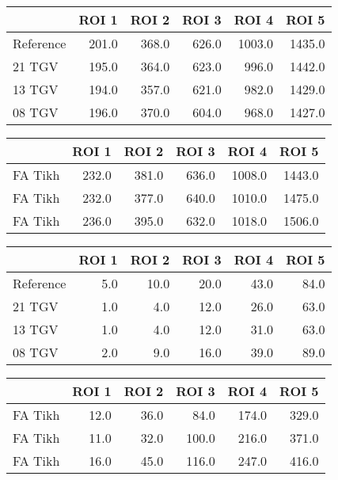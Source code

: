 \begin{tabular}{lrrrrr}
\toprule
{} &  ROI 1 &  ROI 2 &  ROI 3 &   ROI 4 &   ROI 5 \\
\midrule
Reference &  201.0 &  368.0 &  626.0 &  1003.0 &  1435.0 \\
21 TGV    &  195.0 &  364.0 &  623.0 &   996.0 &  1442.0 \\
13 TGV    &  194.0 &  357.0 &  621.0 &   982.0 &  1429.0 \\
08 TGV    &  196.0 &  370.0 &  604.0 &   968.0 &  1427.0 \\
\bottomrule
\end{tabular}
\begin{tabular}{lrrrrr}
\toprule
{} &  ROI 1 &  ROI 2 &  ROI 3 &   ROI 4 &   ROI 5 \\
\midrule
FA Tikh &  232.0 &  381.0 &  636.0 &  1008.0 &  1443.0 \\
FA Tikh &  232.0 &  377.0 &  640.0 &  1010.0 &  1475.0 \\
FA Tikh &  236.0 &  395.0 &  632.0 &  1018.0 &  1506.0 \\
\bottomrule
\end{tabular}
\begin{tabular}{lrrrrr}
\toprule
{} &  ROI 1 &  ROI 2 &  ROI 3 &  ROI 4 &  ROI 5 \\
\midrule
Reference &    5.0 &   10.0 &   20.0 &   43.0 &   84.0 \\
21 TGV    &    1.0 &    4.0 &   12.0 &   26.0 &   63.0 \\
13 TGV    &    1.0 &    4.0 &   12.0 &   31.0 &   63.0 \\
08 TGV    &    2.0 &    9.0 &   16.0 &   39.0 &   89.0 \\
\bottomrule
\end{tabular}
\begin{tabular}{lrrrrr}
\toprule
{} &  ROI 1 &  ROI 2 &  ROI 3 &  ROI 4 &  ROI 5 \\
\midrule
FA Tikh &   12.0 &   36.0 &   84.0 &  174.0 &  329.0 \\
FA Tikh &   11.0 &   32.0 &  100.0 &  216.0 &  371.0 \\
FA Tikh &   16.0 &   45.0 &  116.0 &  247.0 &  416.0 \\
\bottomrule
\end{tabular}
